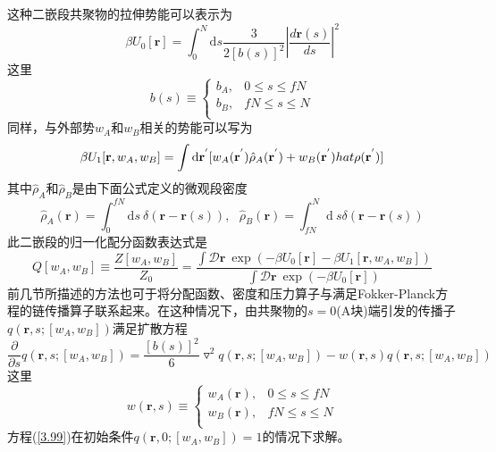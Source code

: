 这种二嵌段共聚物的拉伸势能可以表示为
\begin{equation}
\beta U_0[\mathbf{r}]=\int_{0}^{N} \mathrm{d}s\frac{3}{2[b(s)]^2}\left| \frac{d\mathbf{r}(s)}{ds} \right|^2
\end{equation}
这里
\begin{equation}
b(s)\equiv
\begin{cases}
b_A, & 0\leq s \leq fN \\
b_B, & fN \leq s \leq N\\
\end{cases}
\end{equation}
同样，与外部势$w_A$和$w_B$相关的势能可以写为
\begin{equation}
\beta U_1[\mathbf{r},w_A,w_B]=\int \mathrm{d}\mathbf{r}^{'}[w_A(\mathbf{r}^{'})\hat{\rho}_{A}(\mathbf{r}^{'})+w_B(\mathbf{r}^{'})\\hat{\rho}(\mathbf{r}^{'})]
\end{equation}
其中$\hat{\rho} _A$和$\hat{\rho} _B$是由下面公式定义的微观段密度
\begin{equation}
\hat{\rho} _A(\mathbf{r})=\int _0^{fN} \mathrm{d}s~\delta(\mathbf{r}-\mathbf{r}(s)),~~~\hat{\rho} _B(\mathbf{r})=\int _{fN}^{N} \mathrm{d}~s\delta(\mathbf{r}-\mathbf{r}(s))
\end{equation}
此二嵌段的归一化配分函数表达式是
\begin{equation}
Q[w_A,w_B]\equiv\frac{Z[w_A,w_B]}{Z_0}=\frac{\int \mathcal{D}\mathbf{r}~\exp(-\beta U_0[\mathbf{r}]-\beta U_1[\mathbf{r},w_A,w_B])}{\int \mathcal{D}\mathbf{r}~\exp(-\beta U_0[\mathbf{r}])}
\end{equation}
前几节所描述的方法也可于将分配函数、密度和压力算子与满足Fokker-Planck方程的链传播算子联系起来。在这种情况下，由共聚物的$s=0$(A块)端引发的传播子$q(\mathbf{r},s;[w_A,w_B])$满足扩散方程
\begin{equation}
\frac{\partial}{\partial s}q(\mathbf{r},s;[w_A,w_B])=\frac{[b(s)]^2}{6}\triangledown ^2q(\mathbf{r},s;[w_A,w_B])-w(\mathbf{r},s)q(\mathbf{r},s;[w_A,w_B]) \label{3.99}
\end{equation}
这里
\begin{equation}
w(\mathbf{r},s)\equiv
\begin{cases}
w_A(\mathbf{r}), & 0\leq s \leq fN \\
w_B(\mathbf{r}), & fN \leq s \leq N\\
\end{cases}
\end{equation}
方程(\ref{3.99})在初始条件$q(\mathbf{r},0;[w_A,w_B])=1$的情况下求解。

